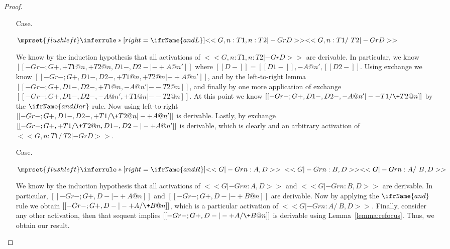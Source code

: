\begin{proof}
\begin{itemize}
  \item[Case.]\ \\ 
    \begin{center}
      \begin{math}
        $$\mprset{flushleft}
        \inferrule* [right=\ifrName{andL}] {
          <<G , n : T1, n : T2 |- Gr D>>
        }{<<G , n : T1 /\ T2   |- Gr D>>}
      \end{math}
    \end{center}
    We know by the induction hypothesis that all activations of $<<G , n : T1, n : T2 |- Gr D>>$
    are derivable.  In particular, we know $[[-Gr- ; {G}+,+T1@n, +T2@n, {D1}-,{D2}- |- + A @ n']]$ where
    $[[{D}-]] = [[{D1}-]],-A@n',[[{D2}-]]$. Using exchange we know $[[-Gr- ; {G}+,{D1}-,{D2}-,+T1@n, +T2@n |- + A @ n']]$, and
    by the left-to-right lemma $[[-Gr- ; {G}+, {D1}-,{D2}-, +T1@n, - A @ n' |- - T2@n]]$, and finally by one more application
    of exchange $[[-Gr- ; {G}+, {D1}-, {D2}-,- A @ n', +T1@n |- - T2@n]]$.  At this point we know 
    $[[-Gr- ; {G}+, {D1}-, {D2}-, - A @ n' |- - T1 /\+ T2 @ n]]$ by the $\ifrName{andBar}$ rule.  Now using left-to-right \\
    $[[-Gr- ; {G}+, {D1}-, {D2}-, + T1 /\+ T2 @ n  |- + A @ n']]$ is derivable. Lastly, by exchange 
    $[[-Gr- ; {G}+, + T1 /\+ T2 @ n, {D1}-, {D2}- |- + A @ n']]$ is derivable, which is clearly and an arbitrary
    activation of $<<G , n : T1 /\ T2   |- Gr D>>$.

  \item[Case.]\ \\ 
    \begin{center}
      \begin{math}
        $$\mprset{flushleft}
        \inferrule* [right=\ifrName{andR}] {
          <<G |- Gr n : A, D>>
          \\\\
          <<G |- Gr n : B, D>>
        }{<<G |- Gr n : A /\ B, D>>}
      \end{math}
    \end{center}
    We know by the induction hypothesis that all activations of $<<G |- Gr n : A, D>>$ and
    $<<G |- Gr n : B, D>>$ are derivable.  In particular, $[[-Gr- ; {G}+,{D}- |- +A @ n]]$
    and $[[-Gr- ; {G}+,{D}- |- +B @ n]]$ are derivable. Now by applying the $\ifrName{and}$ rule
    we obtain $[[-Gr- ; {G}+,{D}- |- + A /\+ B @ n]]$, which is a particular activation of 
    $<<G |- Gr n : A /\ B, D>>$. Finally, consider any other activation, then that sequent implies 
    $[[-Gr- ; {G}+,{D}- |- + A /\+ B @ n]]$ is derivable using Lemma~\ref{lemma:refocus}.  
    Thus, we obtain our result.


\end{itemize}
\end{proof}
